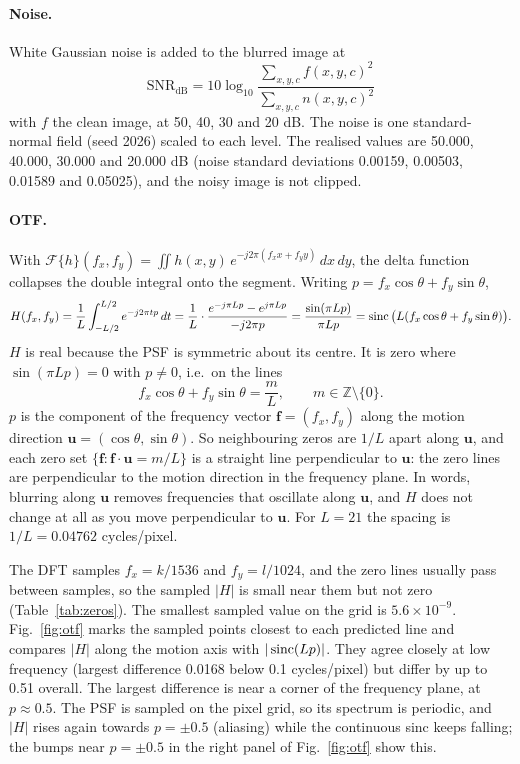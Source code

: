 \paragraph{Noise.} White Gaussian noise is added to the blurred image at
\begin{equation}
\text{SNR}_\text{dB}=10\log_{10}\frac{\sum_{x,y,c}f(x,y,c)^2}{\sum_{x,y,c}n(x,y,c)^2}
\end{equation}
with $f$ the clean image, at 50, 40, 30 and 20 dB. The noise is one
standard-normal field (seed 2026) scaled to each level. The realised values are
50.000, 40.000, 30.000 and 20.000 dB (noise standard deviations 0.00159,
0.00503, 0.01589 and 0.05025), and the noisy image is not clipped.

\paragraph{OTF.} With
$\mathcal F\{h\}(f_x,f_y)=\iint h(x,y)\,e^{-j2\pi(f_xx+f_yy)}\,dx\,dy$, the delta
function collapses the double integral onto the segment. Writing
$p=f_x\cos\theta+f_y\sin\theta$,
\begin{equation}
H(f_x,f_y)=\frac1L\int_{-L/2}^{L/2}e^{-j2\pi tp}\,dt
=\frac1L\cdot\frac{e^{-j\pi Lp}-e^{j\pi Lp}}{-j2\pi p}
=\frac{\sin(\pi Lp)}{\pi Lp}=\operatorname{sinc}\big(L(f_x\cos\theta+f_y\sin\theta)\big).
\end{equation}
$H$ is real because the PSF is symmetric about its centre. It is zero where
$\sin(\pi Lp)=0$ with $p\ne0$, i.e.\ on the lines
\begin{equation}
f_x\cos\theta+f_y\sin\theta=\frac mL,\qquad m\in\mathbb Z\setminus\{0\}.
\end{equation}
$p$ is the component of the frequency vector $\mathbf f=(f_x,f_y)$ along the
motion direction $\mathbf u=(\cos\theta,\sin\theta)$. So neighbouring zeros are
$1/L$ apart along $\mathbf u$, and each zero set
$\{\mathbf f:\mathbf f\cdot\mathbf u=m/L\}$ is a straight line perpendicular to
$\mathbf u$: the zero lines are perpendicular to the motion direction in the
frequency plane. In words, blurring along $\mathbf u$ removes frequencies that
oscillate along $\mathbf u$, and $H$ does not change at all as you move
perpendicular to $\mathbf u$. For $L=21$ the spacing is $1/L=0.04762$
cycles/pixel.

The DFT samples $f_x=k/1536$ and $f_y=l/1024$, and the zero lines usually pass
between samples, so the sampled $|H|$ is small near them but not zero
(Table~\ref{tab:zeros}). The smallest sampled value on the grid is
$5.6\times10^{-9}$. Fig.~\ref{fig:otf} marks the sampled points closest to each
predicted line and compares $|H|$ along the motion axis with $|\operatorname{sinc}(Lp)|$. They
agree closely at low frequency (largest difference 0.0168 below 0.1
cycles/pixel) but differ by up to 0.51 overall. The largest difference is near a
corner of the frequency plane, at $p\approx0.5$. The PSF is sampled on the pixel
grid, so its spectrum is periodic, and $|H|$ rises again towards $p=\pm0.5$
(aliasing) while the continuous sinc keeps falling; the bumps near $p=\pm0.5$ in
the right panel of Fig.~\ref{fig:otf} show this.

